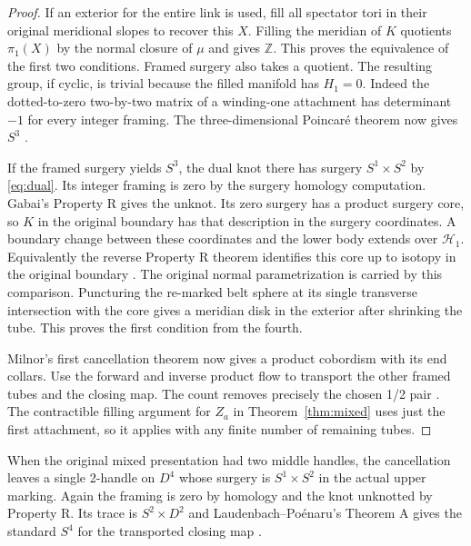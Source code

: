 \documentclass[11pt,letterpaper]{article}
\numberwithin{equation}{section}
\theoremstyle{remark}
\newcommand{\HB}[1]{\mathcal H_{#1}}
\begin{document}
\begin{proof}
If an exterior for the entire link is used, fill all spectator
tori in their original meridional slopes to recover this \(X\).
Filling the meridian of \(K\) quotients \(\pi_1(X)\) by the
normal closure of \(\mu\) and gives \(\mathbb Z\). This proves
the equivalence of the first two conditions. Framed surgery
also takes a quotient. The resulting group, if cyclic,
is trivial because the filled manifold has \(H_1=0\).
Indeed the dotted-to-zero two-by-two matrix of a winding-one
attachment has determinant \(-1\) for every integer framing.
The three-dimensional Poincar\'e theorem now gives \(S^3\)
\cite{Perelman2002,Perelman2003Surgery,Perelman2003Extinction}.

If the framed surgery yields \(S^3\), the dual knot there
has surgery \(S^1\times S^2\) by \eqref{eq:dual}. Its integer framing is
zero by the surgery homology computation. Gabai's Property R
gives the unknot. Its zero surgery has a product surgery core,
so \(K\) in the original boundary has that description in
the surgery coordinates. A boundary change between these
coordinates and the lower body extends over \(\HB{1}\).
Equivalently the reverse Property R theorem identifies this
core up to isotopy in the original boundary
\cite[Corollary 8.3 and Remark 8.5]{Gabai1987FoliationsIII}
\cite[Theorem 10.1]{Scharlemann1989Sutured}
\cite[proof of Theorem A, pp.~341--342]{LaudenbachPoenaru1972Handlebodies}.
The original normal parametrization is carried by this
comparison. Puncturing the re-marked belt sphere at its
single transverse intersection with the core gives a
meridian disk in the exterior after shrinking the tube.
This proves the first condition from the fourth.

Milnor's first cancellation theorem now gives a product
cobordism with its end collars. Use the forward and inverse
product flow to transport the other framed tubes and the
closing map. The count removes precisely the chosen 1/2 pair
\cite[Theorem 5.4]{Milnor1965HCobordism}.
The contractible filling argument for \(Z_a\) in
Theorem~\ref{thm:mixed} uses just the first attachment,
so it applies with any finite number of remaining tubes.
\end{proof}

When the original mixed presentation had two middle handles,
the cancellation leaves a single 2-handle on \(D^4\) whose
surgery is \(S^1\times S^2\) in the actual upper marking.
Again the framing is zero by homology and the knot unknotted
by Property R. Its trace is \(S^2\times D^2\) and
Laudenbach--Po\'enaru's Theorem A gives the standard \(S^4\)
for the transported closing map
\cite[Corollaries 8.3 and 8.6]{Gabai1987FoliationsIII}
\cite[Theorem A]{LaudenbachPoenaru1972Handlebodies}.
\end{document}
